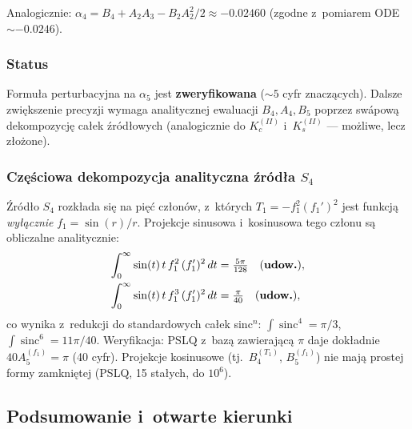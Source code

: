 \medskip\noindent Analogicznie: $\alpha_4 = B_4 + A_2 A_3 - B_2 A_2^2/2 \approx -0.02460$
(zgodne z~pomiarem ODE $\sim -0.0246$).

\subsubsection*{Status}

Formu\l{}a perturbacyjna na $\alpha_5$ jest \textbf{zweryfikowana} ($\sim 5$ cyfr znacz\k{a}cych).
Dalsze zwi\k{e}kszenie precyzji wymaga analitycznej ewaluacji $B_4, A_4, B_5$
poprzez sw\'apow\k{a} dekompozycj\k{e} ca\l{}ek \'zr\'od\l{}owych
(analogicznie do $K_c^{(II)}$ i~$K_s^{(II)}$ --- mo\.zliwe, lecz z\l{}o\.zone).

\subsubsection*{Cz\k{e}\'sciowa dekompozycja analityczna \'zr\'od\l{}a $S_4$}

\'Zr\'od\l{}o $S_4$ rozk\l{}ada si\k{e} na pi\k{e}\'c cz\l{}on\'ow, z~kt\'orych
$T_1 = -f_1^2 (f_1')^2$ jest funkcj\k{a} \emph{wy\l{}\k{a}cznie} $f_1 = \sin(r)/r$.
Projekcje sinusowa i~kosinusowa tego cz\l{}onu s\k{a} obliczalne analitycznie:
\begin{align}
  \int_0^\infty \sin(t)\, t\, f_1^2\, (f_1')^2\, dt &= \tfrac{5\pi}{128} \quad \text{(\textbf{udow.})}, \\
  \int_0^\infty \sin(t)\, t\, f_1^3\, (f_1')^2\, dt &= \tfrac{\pi}{40} \quad \text{(\textbf{udow.})},
\end{align}
co wynika z~redukcji do standardowych ca\l{}ek sinc$^n$: $\int \operatorname{sinc}^4 = \pi/3$,
$\int \operatorname{sinc}^6 = 11\pi/40$.
Weryfikacja: PSLQ z~baz\k{a} zawieraj\k{a}c\k{a} $\pi$ daje dok\l{}adnie $40 A_5^{(f_1)} = \pi$
(40 cyfr). Projekcje kosinusowe (tj.~$B_4^{(T_1)}$, $B_5^{(f_1)}$) nie maj\k{a}
prostej formy zamkni\k{e}tej (PSLQ, 15 sta\l{}ych, do $10^6$).

\subsection{Podsumowanie i~otwarte kierunki}
\label{sec:T6-summary}

